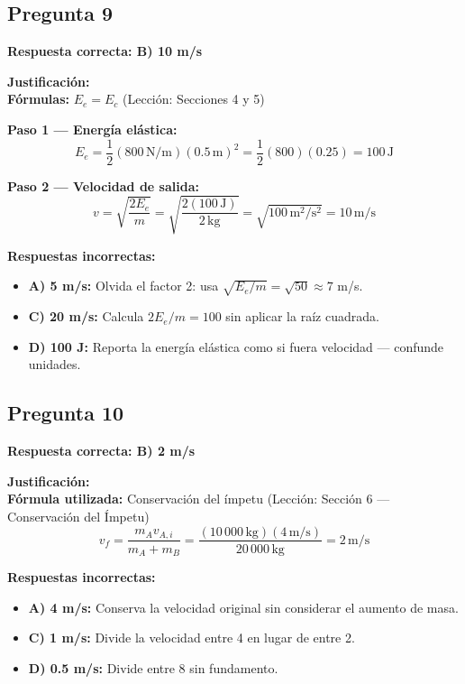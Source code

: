 \begin{respuestabox}
\subsection{Pregunta 9}
\textcolor{verdecorrecto}{\textbf{Respuesta correcta: B) 10 m/s}}

\textbf{Justificación:}\\
\textbf{Fórmulas:} $E_e = E_c$ (Lección: Secciones 4 y 5)

\textbf{Paso 1 --- Energía elástica:}
$$E_e = \frac{1}{2}(800\,\text{N/m})(0.5\,\text{m})^2 = \frac{1}{2}(800)(0.25) = 100\,\text{J}$$

\textbf{Paso 2 --- Velocidad de salida:}
$$v = \sqrt{\frac{2E_e}{m}} = \sqrt{\frac{2(100\,\text{J})}{2\,\text{kg}}} = \sqrt{100\,\text{m}^2/\text{s}^2} = 10\,\text{m/s}$$

\textbf{Respuestas incorrectas:}
\begin{itemize}
    \item \textbf{A) 5 m/s:} Olvida el factor 2: usa $\sqrt{E_e/m} = \sqrt{50} \approx 7$ m/s.
    \item \textbf{C) 20 m/s:} Calcula $2E_e/m = 100$ sin aplicar la raíz cuadrada.
    \item \textbf{D) 100 J:} Reporta la energía elástica como si fuera velocidad --- confunde unidades.
\end{itemize}
\end{respuestabox}

\begin{respuestabox}
\subsection{Pregunta 10}
\textcolor{verdecorrecto}{\textbf{Respuesta correcta: B) 2 m/s}}

\textbf{Justificación:}\\
\textbf{Fórmula utilizada:} Conservación del ímpetu (Lección: Sección 6 --- Conservación del Ímpetu)
$$v_f = \frac{m_A v_{A,i}}{m_A + m_B} = \frac{(10\,000\,\text{kg})(4\,\text{m/s})}{20\,000\,\text{kg}} = 2\,\text{m/s}$$

\textbf{Respuestas incorrectas:}
\begin{itemize}
    \item \textbf{A) 4 m/s:} Conserva la velocidad original sin considerar el aumento de masa.
    \item \textbf{C) 1 m/s:} Divide la velocidad entre 4 en lugar de entre 2.
    \item \textbf{D) 0.5 m/s:} Divide entre 8 sin fundamento.
\end{itemize}
\end{respuestabox}

